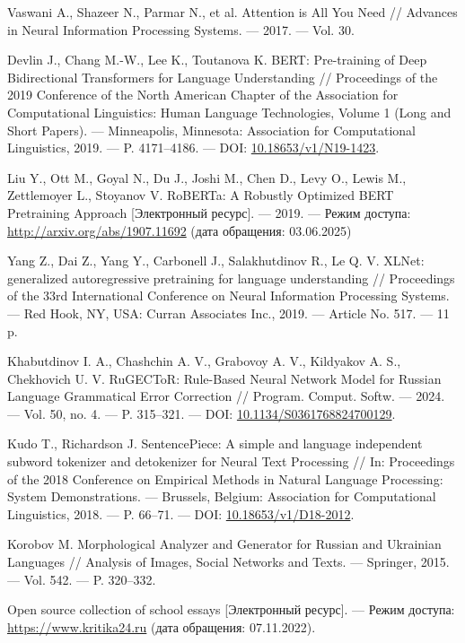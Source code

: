 \begin{thebibliography}{99}
Vaswani A., Shazeer N., Parmar N., et al. Attention is All You Need // Advances in Neural Information Processing Systems. — 2017. — Vol. 30.


Devlin J., Chang M.-W., Lee K., Toutanova K.  
BERT: Pre-training of Deep Bidirectional Transformers for Language Understanding // Proceedings of the 2019 Conference of the North American Chapter of the Association for Computational Linguistics: Human Language Technologies, Volume 1 (Long and Short Papers). — Minneapolis, Minnesota: Association for Computational Linguistics, 2019. — P. 4171–4186. — DOI: \url{10.18653/v1/N19-1423}.

Liu Y., Ott M., Goyal N., Du J., Joshi M., Chen D., Levy O., Lewis M., Zettlemoyer L., Stoyanov V.  
RoBERTa: A Robustly Optimized BERT Pretraining Approach [Электронный ресурс]. — 2019. — Режим доступа: \url{http://arxiv.org/abs/1907.11692} (дата обращения: 03.06.2025)


Yang Z., Dai Z., Yang Y., Carbonell J., Salakhutdinov R., Le Q. V.  
XLNet: generalized autoregressive pretraining for language understanding // Proceedings of the 33rd International Conference on Neural Information Processing Systems. — Red Hook, NY, USA: Curran Associates Inc., 2019. — Article No. 517. — 11 p.

Khabutdinov I. A., Chashchin A. V., Grabovoy A. V., Kildyakov A. S., Chekhovich U. V.  
RuGECToR: Rule-Based Neural Network Model for Russian Language Grammatical Error Correction // Program. Comput. Softw. — 2024. — Vol. 50, no. 4. — P. 315–321. — DOI: \href{https://doi.org/10.1134/S0361768824700129}{10.1134/S0361768824700129}.

Kudo T., Richardson J.  
SentencePiece: A simple and language independent subword tokenizer and detokenizer for Neural Text Processing // In: Proceedings of the 2018 Conference on Empirical Methods in Natural Language Processing: System Demonstrations. — Brussels, Belgium: Association for Computational Linguistics, 2018. — P. 66–71. — DOI: \href{https://doi.org/10.18653/v1/D18-2012}{10.18653/v1/D18-2012}.

Korobov M. Morphological Analyzer and Generator for Russian and Ukrainian Languages // Analysis of Images, Social Networks and Texts. — Springer, 2015. — Vol. 542. — P. 320–332.

Open source collection of school essays [Электронный ресурс]. — Режим доступа: \url{https://www.kritika24.ru} (дата обращения: 07.11.2022).


\end{thebibliography}
